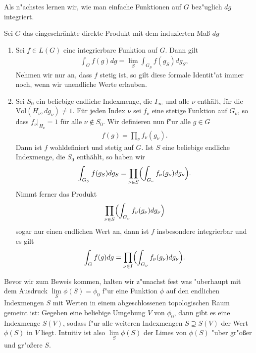 		Als n"achstes lernen wir, wie man einfache Funktionen auf $G$ bez"uglich $dg$ integriert.
		\begin{proposition}\label{prop:rdp:integrieren}
			Sei $G$ das eingeschränkte direkte Produkt mit dem induzierten Maß $dg$
			\begin{enumerate}[label=\emph{(\roman*)}]
				\item Sei $f \in L(G)$ eine integrierbare Funktion auf $G$. Dann gilt
					\begin{align*}
						\int_G f(g)dg = \lim_S \int_{G_S} f(g_S) dg_S,
					\end{align*}
					Nehmen wir nur an, dass $f$ stetig ist, so gilt diese formale Identit"at immer noch, wenn wir unendliche Werte erlauben.
				\item Sei $S_0$ ein beliebige endliche Indexmenge, die $I_\infty$ und alle $\nu$ enthält, für die $\text{Vol}(H_\nu, dg_\nu) \not= 1$. 
					Für jeden Index $\nu$ sei $f_\nu$ eine stetige Funktion auf $G_\nu$, so dass $f_\nu |_{H_\nu} = 1$ für alle $\nu \notin S_0$. 
					Wir definieren nun f"ur alle $g\in G$ 
					\begin{align*}
						f(g) = \prod_{\nu}f_\nu(g_\nu).
					\end{align*} 
					Dann ist $f$ wohldefiniert und stetig auf $G$. 
					Ist $S$ eine beliebige endliche Indexmenge, die $S_0$ enthählt, so haben wir
					\begin{align}\label{eq:satz:integration}
						\int_{G_S} f(g_S) dg_S = \prod_{\nu\in S}\Bigl(\int_{G_\nu} f_\nu (g_\nu)dg_\nu\Bigr).
					\end{align}
					Nimmt ferner das Produkt
					\begin{align*}
						\prod_{\nu\in S}\Bigl(\int_{G_\nu} f_\nu (g_\nu)dg_\nu\Bigr)
					\end{align*}
					sogar nur einen endlichen Wert an, dann ist $f$ insbesondere integrierbar und es gilt
					\begin{align*}
						\int_{G} f(g) dg = \prod_{\nu\in I}\Bigl(\int_{G_\nu} f_\nu (g_\nu)dg_\nu\Bigr).
					\end{align*}	
			\end{enumerate}
		\end{proposition}
		Bevor wir zum Beweis kommen, halten wir z"unachst fest was "uberhaupt mit dem Ausdruck $\lim\limits_S \phi(S) = \phi_0$ f"ur eine Funktion $\phi$ auf den endlichen Indexmengen $S$ mit Werten in einem abgeschlossenen topologischen Raum gemeint ist: Gegeben eine beliebige Umgebung $V$ von $\phi_0$, dann gibt es eine Indexmenge $S(V)$, sodass f"ur alle weiteren Indexmengen $S \supseteq S(V)$ der Wert $\phi(S)$ in $V$ liegt. Intuitiv ist also  $\lim\limits_S \phi(S)$ der Limes von $\phi(S)$ "uber gr"oßer und gr"oßere $S$.
			
